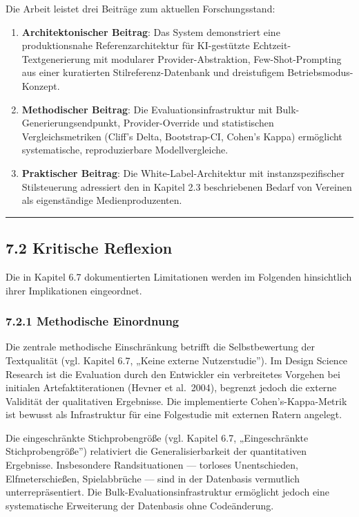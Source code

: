 Die Arbeit leistet drei Beiträge zum aktuellen Forschungsstand:

\begin{enumerate}
\def\labelenumi{\arabic{enumi}.}
\item
  \textbf{Architektonischer Beitrag}: Das System demonstriert eine
  produktionsnahe Referenzarchitektur für KI-gestützte
  Echtzeit-Textgenerierung mit modularer Provider-Abstraktion,
  Few-Shot-Prompting aus einer kuratierten Stilreferenz-Datenbank und
  dreistufigem Betriebsmodus-Konzept.
\item
  \textbf{Methodischer Beitrag}: Die Evaluationsinfrastruktur mit
  Bulk-Generierungsendpunkt, Provider-Override und statistischen
  Vergleichsmetriken (Cliff's Delta, Bootstrap-CI, Cohen's Kappa)
  ermöglicht systematische, reproduzierbare Modellvergleiche.
\item
  \textbf{Praktischer Beitrag}: Die White-Label-Architektur mit
  instanzspezifischer Stilsteuerung adressiert den in Kapitel 2.3
  beschriebenen Bedarf von Vereinen als eigenständige Medienproduzenten.
\end{enumerate}

\begin{center}\rule{0.5\linewidth}{0.5pt}\end{center}

\subsection{7.2 Kritische Reflexion}\label{kritische-reflexion}

Die in Kapitel 6.7 dokumentierten Limitationen werden im Folgenden
hinsichtlich ihrer Implikationen eingeordnet.

\subsubsection{7.2.1 Methodische
Einordnung}\label{methodische-einordnung}

Die zentrale methodische Einschränkung betrifft die Selbstbewertung der
Textqualität (vgl. Kapitel 6.7, „Keine externe Nutzerstudie''). Im
Design Science Research ist die Evaluation durch den Entwickler ein
verbreitetes Vorgehen bei initialen Artefaktiterationen (Hevner et
al.~2004), begrenzt jedoch die externe Validität der qualitativen
Ergebnisse. Die implementierte Cohen's-Kappa-Metrik ist bewusst als
Infrastruktur für eine Folgestudie mit externen Ratern angelegt.

Die eingeschränkte Stichprobengröße (vgl. Kapitel 6.7, „Eingeschränkte
Stichprobengröße'') relativiert die Generalisierbarkeit der
quantitativen Ergebnisse. Insbesondere Randsituationen --- torloses
Unentschieden, Elfmeterschießen, Spielabbrüche --- sind in der
Datenbasis vermutlich unterrepräsentiert. Die
Bulk-Evaluationsinfrastruktur ermöglicht jedoch eine systematische
Erweiterung der Datenbasis ohne Codeänderung.

